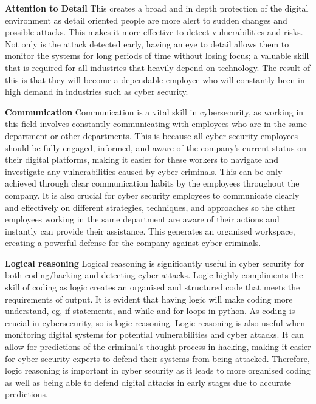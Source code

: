 \documentclass[a4paper, 11pt]{report}
\begin{document}
\textbf{Attention to Detail}
This creates a broad and in depth protection of the digital environment as detail oriented people are more alert to sudden changes and possible attacks. This  makes it more effective to detect vulnerabilities and risks. Not only is the attack detected early, having an eye to detail allows them to monitor the systems for long periods of time without losing focus; a valuable skill that is required for all industries that heavily depend on technology. The result of this is that they will become a dependable employee who will constantly been in high demand in industries such as cyber security. 

\textbf{Communication}
Communication is a vital skill in cybersecurity, as working in this field involves constantly communicating with employees who are in the same department or other departments. This is because all cyber security employees should be fully engaged, informed, and aware of the company's current status on their digital platforms, making it easier for these workers to navigate and investigate any vulnerabilities caused by cyber criminals. This can be only achieved through clear communication habits by the employees throughout the company. It is also crucial for cyber security employees to communicate clearly and effectively on different strategies, techniques, and approaches so the other employees working in the same department are aware of their actions and instantly can provide their assistance. This generates an organised workspace, creating a powerful defense for the company against cyber criminals. 

\textbf{Logical reasoning}
Logical reasoning is significantly useful in cyber security for both coding/hacking and detecting cyber attacks. Logic highly compliments the skill of coding as logic creates an organised and structured code that meets the requirements of output. It is evident that having logic will make coding more understand, eg, if statements, and while and for loops in python. As coding is crucial in cybersecurity, so is logic reasoning. Logic reasoning is also useful when monitoring digital systems for potential vulnerabilities and cyber attacks. It can allow for predictions of the criminal’s thought process in hacking, making it easier for cyber security experts to defend their systems from being attacked. Therefore, logic reasoning is important in cyber security as it leads to more organised coding as well as being able to defend digital attacks in early stages due to accurate predictions.
\end{document}
